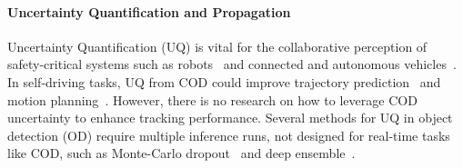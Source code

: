 \paragraph{Uncertainty Quantification and Propagation}\label{subsec:uq}

Uncertainty Quantification (UQ) is vital for the collaborative perception of safety-critical systems such as robots~\cite{rss19, perceptionCBF_corl21} and connected and autonomous vehicles~\cite{han2022solution, han2022stable, he2023robust}. 
In self-driving tasks, UQ from COD could improve trajectory prediction~\cite{boris2022propagating} and motion planning~\cite{mpUncertain_icra14}. However, there is no research on how to leverage COD uncertainty to enhance tracking performance. Several methods for UQ in object detection (OD) require multiple inference runs, not designed for real-time tasks like COD, such as Monte-Carlo dropout~\cite{miller2018dropout} and deep ensemble~\cite{lakshminarayanan2017simple,lyu2020probabilistic}. %


